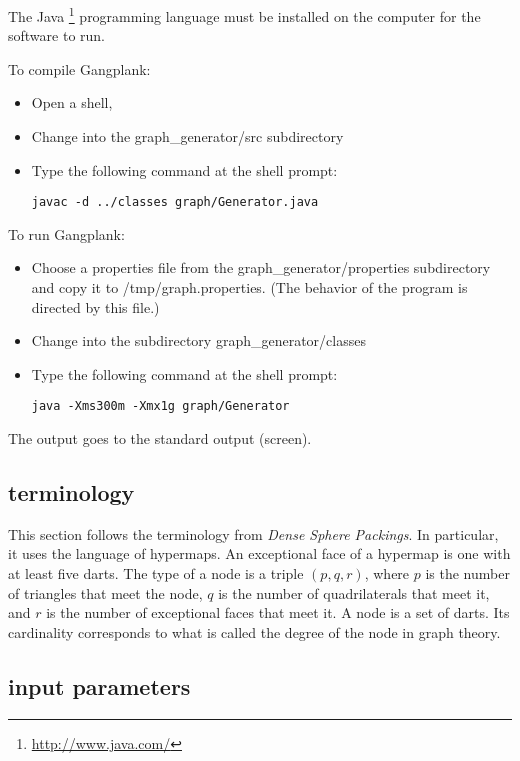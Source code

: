 The Java%
\footnote{\url{http://www.java.com/}} %
 programming language must be installed on the computer for the software to run.

To compile Gangplank:

\begin{itemize} 
\item Open a shell, 
\item Change into the graph\_generator/src subdirectory
\item Type the following command at the shell prompt:
\begin{verbatim}
javac -d ../classes graph/Generator.java 
\end{verbatim}
\end{itemize}

To run Gangplank:

\begin{itemize}
\item Choose a properties file from the graph\_generator/properties subdirectory and copy it to /tmp/graph.properties.  (The behavior of the program is directed by this file.)
\item Change into the subdirectory graph\_generator/classes
\item Type the following command at the shell prompt:
\begin{verbatim}
java -Xms300m -Xmx1g graph/Generator  
\end{verbatim}
\end{itemize}

The output goes to the standard output (screen).

\subsection{terminology}

This section follows the terminology from {\it Dense Sphere Packings}.  In particular,
it uses the language of hypermaps.  An exceptional face of a hypermap is one with
at least five darts.  The type of a node is a triple $(p,q,r)$,
where $p$ is the number of triangles that meet the node, $q$ is the number of quadrilaterals that meet it, and $r$ is the number of exceptional faces that meet it.
A node is a set of darts. Its cardinality corresponds to what is called the degree of the
node in graph theory.

\subsection{input parameters}

